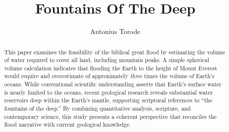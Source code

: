 \documentclass[10pt]{article}
\title{Fountains Of The Deep}
\author{Antonius Torode}
\begin{document}
\maketitle
\thispagestyle{fancy}


\begin{abstract}
This paper examines the feasibility of the biblical great flood by estimating the volume of water required to cover all land, including mountain peaks. A simple spherical volume calculation indicates that flooding the Earth to the height of Mount Everest would require and overestimate of approximately \textit{three} times the volume of Earth’s oceans. While conventional scientific understanding asserts that Earth’s surface water is nearly limited to the oceans, recent geological research reveals substantial water reservoirs deep within the Earth’s mantle, supporting scriptural references to “the fountains of the deep.” By combining quantitative analysis, scripture, and contemporary science, this study presents a coherent perspective that reconciles the flood narrative with current geological knowledge.
\end{abstract}
\end{document}
